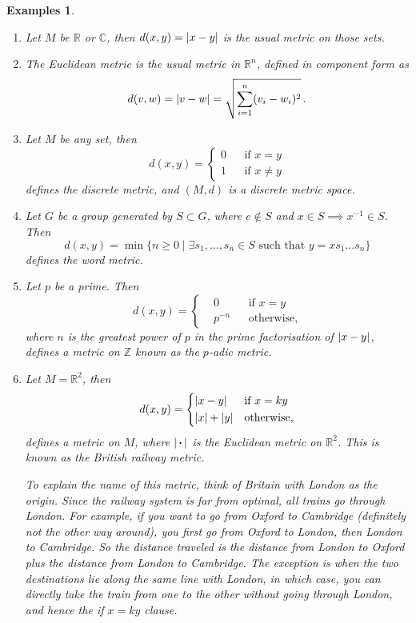 \documentclass{article}
\theoremstyle{plain}\theoremheaderfont{\normalfont\itshape}\theorembodyfont{\rmfamily}\theoremseparator{.}\newtheorem*{rem}{Remark}\newtheorem*{ex}{Example}\newtheorem*{proof}{Proof}\newtheorem*{altp}{Alternative proof}
\theoremstyle{plain}\theoremheaderfont{\normalfont\bfseries}\theorembodyfont{\rmfamily}\theoremseparator{.}\newtheorem{thm}{Theorem}[section]\newtheorem{lem}[thm]{Lemma}\newtheorem{prop}[thm]{Proposition}\newtheorem*{cor}{Corollary}\newtheorem{defn}[thm]{Definition}\newtheorem{clm}[thm]{Claim}\newtheorem{clminproof}{Claim}
\theoremstyle{break}\theoremheaderfont{\normalfont\itshape}\theorembodyfont{\rmfamily}\theoremseparator{.\medskip}\newtheorem*{proofskip}{Proof}\newtheorem*{exs}{Examples}\newtheorem*{rems}{Remarks}
\theoremstyle{break}\theoremheaderfont{\normalfont\bfseries}\theorembodyfont{\rmfamily}\theoremseparator{.\medskip}\newtheorem{lemskip}[thm]{Lemma}\newtheorem{defnskip}[thm]{Definition}\newtheorem{propskip}[thm]{Proposition}\newtheorem{thmskip}[thm]{Theorem}
\begin{document}
    \begin{exs}
        \begin{enumerate}[label=(\roman*),topsep=0pt]
            \item Let \(M\) be \(\mathbb{R}\) or \(\mathbb{C}\), then \(d(x,y)=\abs{x-y}\) is the usual metric on those sets.
            \item The \textit{Euclidean metric} is the usual metric in \(\mathbb{R}^n\), defined in component form as
            \[d(v,w)=\abs{v-w}=\sqrt{\sum_{i=1}^{n}(v_i-w_i)^2}\,.\]
            \item Let \(M\) be any set, then
            \[d(x,y)=\left\{\begin{aligned}
                0 && \text{if }x=y\\
                1 && \text{if }x\ne y
            \end{aligned}\right.\]
            defines the \textit{discrete metric}, and \((M,d)\) is a \textit{discrete metric space}.
            \item Let \(G\) be a group generated by \(S\subset G\), where \(e\notin S\) and \(x\in S\implies x^{-1}\in S\). Then
            \[d(x,y)=\min\{n\ge 0\mid\exists s_1,\dots,s_n\in S\text{ such that }y=xs_1\dots s_n\}\]
            defines the \textit{word metric}.
            \item Let \(p\) be a prime. Then
            \[d(x,y)=\left\{\begin{aligned}
                &0 && \text{if }x=y\\
                &p^{-n} && \text{otherwise,}
            \end{aligned}\right.\]
            where \(n\) is the greatest power of \(p\) in the prime factorisation of \(\abs{x-y}\), defines a metric on \(\mathbb{Z}\) known as the \textit{\(p\)-adic metric}.
            \item Let \(M=\mathbb{R}^2\), then
            \[d(x,y)=\left\{\begin{aligned}
                &\abs{x-y} && \text{if }x=ky\\
                &\abs{x}+\abs{y} && \text{otherwise,}
            \end{aligned}\right.\]
            defines a metric on \(M\), where \(\abs{\,\vdot\,}\) is the Euclidean metric on \(\mathbb{R}^2\). This is known as the \textit{British railway metric}.
    
            To explain the name of this metric, think of Britain with London as the origin. Since the railway system is far from optimal, all trains go through London. For example, if you want to go from Oxford to Cambridge (definitely not the other way around), you first go from Oxford to London, then London to Cambridge. So the distance traveled is the distance from London to Oxford plus the distance from London to Cambridge. The exception is when the two destinations lie along the same line with London, in which case, you can directly take the train from one to the other without going through London, and hence the if \(x=ky\) clause.
        \end{enumerate}
    \end{exs}
    
\end{document}
